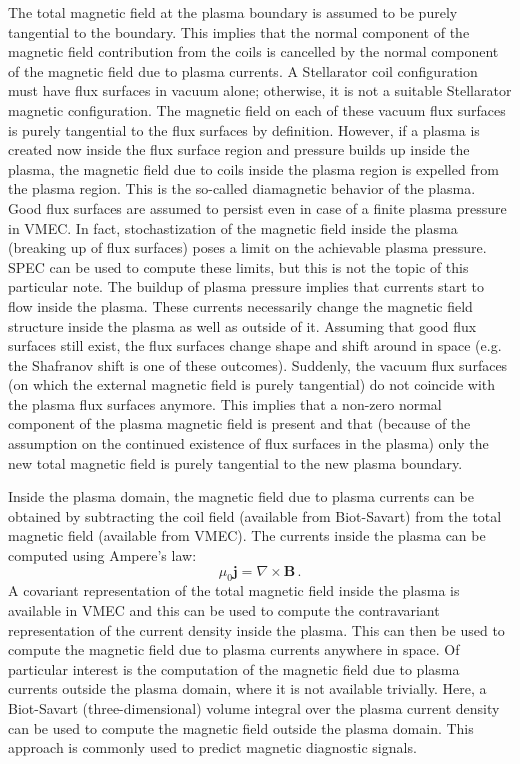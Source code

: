 The total magnetic field at the plasma boundary is assumed to be purely tangential to the boundary.
This implies that the normal component of the magnetic field contribution from the coils
is cancelled by the normal component of the magnetic field due to plasma currents.
A Stellarator coil configuration must have flux surfaces in vacuum alone;
otherwise, it is not a suitable Stellarator magnetic configuration.
The magnetic field on each of these vacuum flux surfaces
is purely tangential to the flux surfaces by definition.
However, if a plasma is created now inside the flux surface region
and pressure builds up inside the plasma,
the magnetic field due to coils inside the plasma region is expelled from the plasma region.
This is the so-called diamagnetic behavior of the plasma.
Good flux surfaces are assumed to persist even in case of a finite plasma pressure in VMEC.
In fact, stochastization of the magnetic field inside the plasma (breaking up of flux surfaces)
poses a limit on the achievable plasma pressure. SPEC can be used to compute these limits,
but this is not the topic of this particular note.
The buildup of plasma pressure implies that currents start to flow inside the plasma.
These currents necessarily change the magnetic field structure inside the plasma as well as outside of it.
Assuming that good flux surfaces still exist,
the flux surfaces change shape and shift around in space (e.g. the Shafranov shift is one of these outcomes).
Suddenly, the vacuum flux surfaces (on which the external magnetic field is purely tangential)
do not coincide with the plasma flux surfaces anymore.
This implies that a non-zero normal component of the plasma magnetic field is present
and that (because of the assumption on the continued existence of flux surfaces in the plasma)
only the new total magnetic field is purely tangential to the new plasma boundary.

Inside the plasma domain, the magnetic field due to plasma currents
can be obtained by subtracting the coil field (available from Biot-Savart)
from the total magnetic field (available from VMEC).
The currents inside the plasma can be computed using Ampere's law:
\begin{equation}
 \mu_0 \mathbf{j} = \nabla \times \mathbf{B} \, .
\end{equation}
A covariant representation of the total magnetic field inside the plasma is available in VMEC
and this can be used to compute the contravariant representation of the current density inside the plasma.
This can then be used to compute the magnetic field due to plasma currents anywhere in space.
Of particular interest is the computation of the magnetic field due to plasma currents
outside the plasma domain, where it is not available trivially.
Here, a Biot-Savart (three-dimensional) volume integral over the plasma current density
can be used to compute the magnetic field outside the plasma domain.
This approach is commonly used to predict magnetic diagnostic signals.

